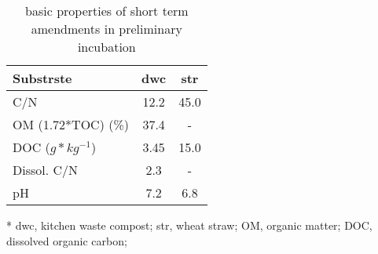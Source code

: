 \begin{table}[H]
\centering
\caption{basic properties of short term amendments in preliminary incubation}
\label{amendments_properties_preliminary}
\begin{threeparttable}

\begin{tabular}{l    cc}
\toprule
{Substrste} &    \gls{dwc} &   \gls{str} \\
\midrule
{C/N              } &   12.2 &  45.0 \\
{OM (1.72*TOC) (\%)} &   37.4 &     - \\
{DOC ($ g*kg^{-1} $)    } &  3.45 &  15.0 \\
{Dissol. C/N      } &    2.3 &     - \\
{pH               } &    7.2 &   6.8 \\
\bottomrule
\end{tabular}

\begin{tablenotes}
	\item[*] \scriptsize \gls{dwc}, kitchen waste compost; \gls{str}, wheat straw;  OM, organic matter; DOC, dissolved organic carbon;
\end{tablenotes}

\end{threeparttable}
\end{table}

